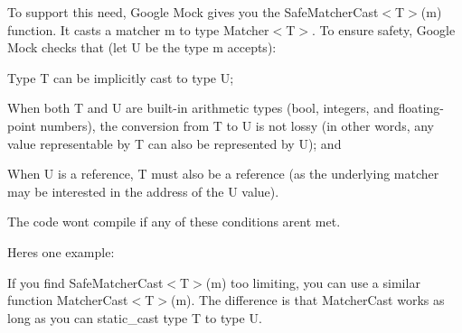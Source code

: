 To support this need, Google Mock gives you the {\ttfamily Safe\+Matcher\+Cast$<$T$>$(m)} function. It casts a matcher {\ttfamily m} to type {\ttfamily Matcher$<$T$>$}. To ensure safety, Google Mock checks that (let {\ttfamily U} be the type {\ttfamily m} accepts)\+:


\begin{DoxyEnumerate}
\item Type {\ttfamily T} can be implicitly cast to type {\ttfamily U};
\end{DoxyEnumerate}
\begin{DoxyEnumerate}
\item When both {\ttfamily T} and {\ttfamily U} are built-\/in arithmetic types ({\ttfamily bool}, integers, and floating-\/point numbers), the conversion from {\ttfamily T} to {\ttfamily U} is not lossy (in other words, any value representable by {\ttfamily T} can also be represented by {\ttfamily U}); and
\end{DoxyEnumerate}
\begin{DoxyEnumerate}
\item When {\ttfamily U} is a reference, {\ttfamily T} must also be a reference (as the underlying matcher may be interested in the address of the {\ttfamily U} value).
\end{DoxyEnumerate}

The code won\textquotesingle{}t compile if any of these conditions aren\textquotesingle{}t met.

Here\textquotesingle{}s one example\+:


\begin{DoxyCode}{0}
\DoxyCodeLine{}
\DoxyCodeLine{}
\DoxyCodeLine{\};}
\DoxyCodeLine{}
\end{DoxyCode}


If you find {\ttfamily Safe\+Matcher\+Cast$<$T$>$(m)} too limiting, you can use a similar function {\ttfamily Matcher\+Cast$<$T$>$(m)}. The difference is that {\ttfamily Matcher\+Cast} works as long as you can {\ttfamily static\+\_\+cast} type {\ttfamily T} to type {\ttfamily U}.

